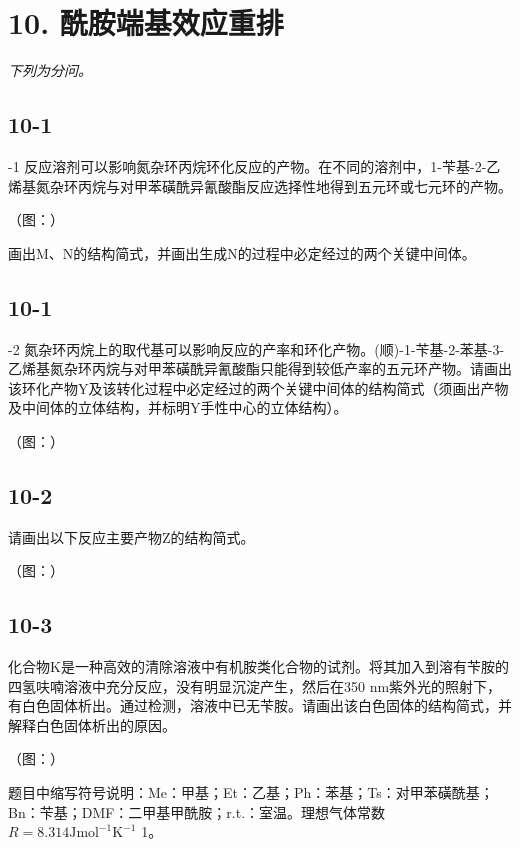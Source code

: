 \section*{10. 酰胺端基效应重排}
\textit{下列为分问。}

\subsection*{10-1}
-1 反应溶剂可以影响氮杂环丙烷环化反应的产物。在不同的溶剂中，1-苄基-2-⼄烯基氮杂环丙烷与对甲苯磺酰异氰酸酯反应选择性地得到五元环或七元环的产物。

（图：）

画出M、N的结构简式，并画出⽣成N的过程中必定经过的两个关键中间体。

\subsection*{10-1}
-2 氮杂环丙烷上的取代基可以影响反应的产率和环化产物。(顺)-1-苄基-2-苯基-3-⼄烯基氮杂环丙烷与对甲苯磺酰异氰酸酯只能得到较低产率的五元环产物。请画出该环化产物Y及该转化过程中必定经过的两个关键中间体的结构简式（须画出产物及中间体的⽴体结构，并标明Y⼿性中⼼的⽴体结构）。

（图：）

\subsection*{10-2}
请画出以下反应主要产物Z的结构简式。

（图：）

\subsection*{10-3}
化合物K是⼀种⾼效的清除溶液中有机胺类化合物的试剂。将其加⼊到溶有苄胺的四氢呋喃溶液中充分反应，没有明显沉淀产⽣，然后在350 nm紫外光的照射下，有⽩⾊固体析出。通过检测，溶液中已⽆苄胺。请画出该⽩⾊固体的结构简式，并解释⽩⾊固体析出的原因。

（图：）

题⽬中缩写符号说明：Me：甲基；Et：⼄基；Ph：苯基；Ts：对甲苯磺酰基；Bn：苄基；DMF：⼆甲基甲酰胺；r.t.：室温。理想⽓体常数 $R = 8 . 3 1 4 \mathrm { J } \mathrm { m o l } ^ { - 1 } \mathrm { K } ^ { - 1 }$ 1。
